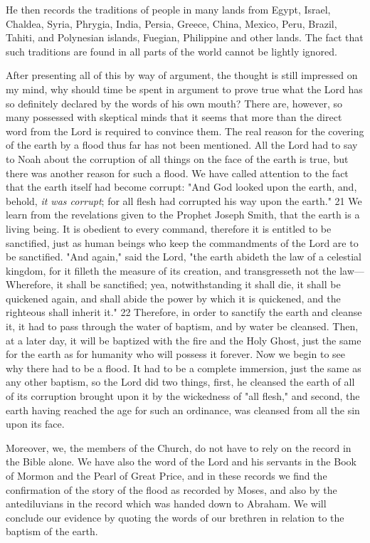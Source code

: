 He then records the traditions of people in many lands from Egypt, Israel, Chaldea, Syria,
Phrygia, India, Persia, Greece, China, Mexico, Peru, Brazil, Tahiti, and Polynesian islands,
Fuegian, Philippine and other lands. The fact that such traditions are found in all parts of the
world cannot be lightly ignored.

After presenting all of this by way of argument, the thought is still impressed on my mind,
why should time be spent in argument to prove true what the Lord has so definitely declared
by the words of his own mouth? There are, however, so many possessed with skeptical minds
that it seems that more than the direct word from the Lord is required to convince them. The
real reason for the covering of the earth by a flood thus far has not been mentioned. All the
Lord had to say to Noah about the corruption of all things on the face of the earth is true, but
there was another reason for such a flood. We have called attention to the fact that the earth
itself had become corrupt: "And God looked upon the earth, and, behold, \textit{it was corrupt}; for
all flesh had corrupted his way upon the earth." 21 We learn from the revelations given to the
Prophet Joseph Smith, that the earth is a living being. It is obedient to every command,
therefore it is entitled to be sanctified, just as human beings who keep the commandments of
the Lord are to be sanctified. "And again," said the Lord, "the earth abideth the law of a
celestial kingdom, for it filleth the measure of its creation, and transgresseth not the law—
Wherefore, it shall be sanctified; yea, notwithstanding it shall die, it shall be quickened again,
and shall abide the power by which it is quickened, and the righteous shall inherit it." 22
Therefore, in order to sanctify the earth and cleanse it, it had to pass through the water of
baptism, and by water be cleansed. Then, at a later day, it will be baptized with the fire and
the Holy Ghost, just the same for the earth as for humanity who will possess it forever. Now
we begin to see why there had to be a flood. It had to be a complete immersion, just the same
as any other baptism, so the Lord did two things, first, he cleansed the earth of all of its
corruption brought upon it by the wickedness of "all flesh," and second, the earth having
reached the age for such an ordinance, was cleansed from all the sin upon its face.

Moreover, we, the members of the Church, do not have to rely on the record in the Bible
alone. We have also the word of the Lord and his servants in the Book of Mormon and the
Pearl of Great Price, and in these records we find the confirmation of the story of the flood as
recorded by Moses, and also by the antediluvians in the record which was handed down to
Abraham. We will conclude our evidence by quoting the words of our brethren in relation to
the baptism of the earth.

